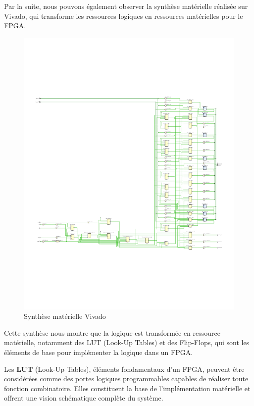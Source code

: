 \vspace{10pt}

Par la suite, nous pouvons également observer la synthèse matérielle réalisée sur Vivado, qui 
transforme les ressources logiques en ressources matérielles pour le FPGA.
\newline

\begin{figure}[H]
    \centering
    \includegraphics[width=0.8\linewidth]{images/Routage/schematic_RTL_VIVADO_recadre.pdf}
    \caption{Synthèse matérielle Vivado}
    \label{fig:rout_general}
\end{figure}

Cette synthèse nous montre que la logique est transformée en ressource matérielle, notamment des 
LUT (Look-Up Tables) et des Flip-Flops, qui sont les éléments de base pour implémenter la logique 
dans un FPGA.
\newline

Les \textbf{LUT} (Look-Up Tables), éléments fondamentaux d'un FPGA, peuvent être considérées comme 
des portes logiques programmables capables de réaliser toute fonction combinatoire. 
Elles constituent la base de l'implémentation matérielle et offrent une vision schématique complète 
du système.  
\newline

